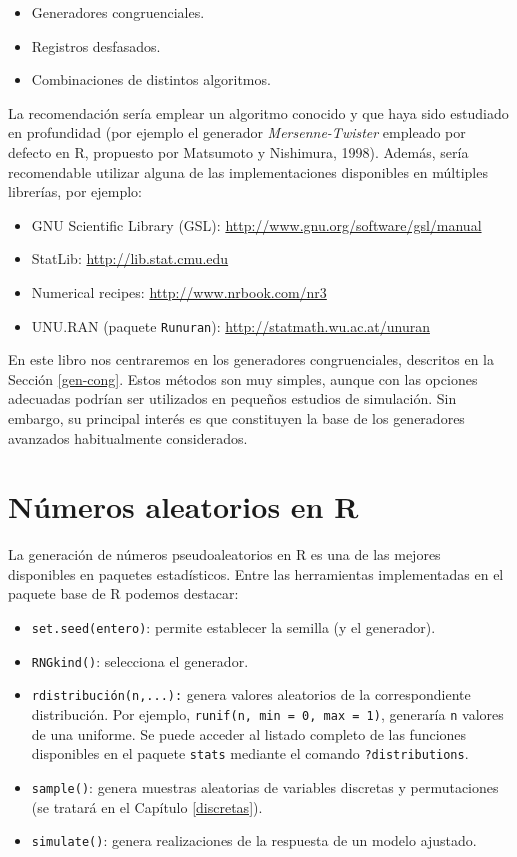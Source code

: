 \documentclass[
]{book}
\theoremstyle{break}
\theoremstyle{definition}
\theoremstyle{definition}
\theoremstyle{definition}
\theoremstyle{definition}
\theoremstyle{remark}
\begin{document}
\begin{itemize}
\item
  Generadores congruenciales.
\item
  Registros desfasados.
\item
  Combinaciones de distintos algoritmos.
\end{itemize}

La recomendación sería emplear un algoritmo conocido y que haya sido estudiado en profundidad (por ejemplo el generador \emph{Mersenne-Twister} empleado por defecto en R, propuesto por Matsumoto y Nishimura, 1998).
Además, sería recomendable utilizar alguna de las implementaciones disponibles en múltiples librerías, por ejemplo:

\begin{itemize}
\item
  GNU Scientific Library (GSL):
  \href{http://www.gnu.org/software/gsl/manual/html_node/Random-Number-Generation.html}{http://www.gnu.org/software/gsl/manual}
\item
  StatLib: \url{http://lib.stat.cmu.edu}
\item
  Numerical recipes: \url{http://www.nrbook.com/nr3}
\item
  UNU.RAN (paquete \texttt{Runuran}):
  \url{http://statmath.wu.ac.at/unuran}
\end{itemize}

En este libro nos centraremos en los generadores congruenciales, descritos en la Sección \ref{gen-cong}.
Estos métodos son muy simples, aunque con las opciones adecuadas podrían ser utilizados en pequeños estudios de simulación. Sin embargo, su principal interés es que constituyen la base de los generadores avanzados habitualmente considerados.

\hypertarget{rrng}{%
\chapter{Números aleatorios en R}\label{rrng}}

La generación de números pseudoaleatorios en R es una de las mejores
disponibles en paquetes estadísticos.
Entre las herramientas implementadas en el paquete base de R podemos destacar:

\begin{itemize}
\item
  \texttt{set.seed(entero)}: permite establecer la semilla (y el generador).
\item
  \texttt{RNGkind()}: selecciona el generador.
\item
  \texttt{rdistribución(n,...):} genera valores aleatorios de la correspondiente distribución.
  Por ejemplo, \texttt{runif(n,\ min\ =\ 0,\ max\ =\ 1)}, generaría \texttt{n} valores de una uniforme. Se puede acceder al listado completo de las funciones disponibles en el paquete \texttt{stats} mediante el comando \texttt{?distributions}.
\item
  \texttt{sample()}: genera muestras aleatorias de variables discretas y permutaciones (se tratará en el Capítulo \ref{discretas}).
\item
  \texttt{simulate()}: genera realizaciones de la respuesta de un modelo ajustado.
\end{itemize}
\end{document}
